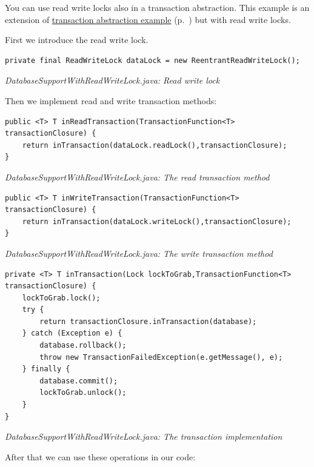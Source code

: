 You can use read write locks also in a transaction abstraction. This example is an extension of \hyperref[ref:advanced-topics-concurrency-share-object-container-threads]{transaction abstraction example} (p.~\pageref{ref:advanced-topics-concurrency-share-object-container-threads}) but with read write locks.

First we introduce the read write lock.

\begin{lstlisting}
private final ReadWriteLock dataLock = new ReentrantReadWriteLock();
\end{lstlisting}

{\small\itshape DatabaseSupportWithReadWriteLock.java: Read write lock\par}
\medskip

Then we implement read and write transaction methods:

\begin{lstlisting}
public <T> T inReadTransaction(TransactionFunction<T> transactionClosure) {
    return inTransaction(dataLock.readLock(),transactionClosure);
}
\end{lstlisting}

{\small\itshape DatabaseSupportWithReadWriteLock.java: The read transaction method\par}
\medskip

\begin{lstlisting}
public <T> T inWriteTransaction(TransactionFunction<T> transactionClosure) {
    return inTransaction(dataLock.writeLock(),transactionClosure);
}
\end{lstlisting}

{\small\itshape DatabaseSupportWithReadWriteLock.java: The write transaction method\par}
\medskip

\begin{lstlisting}
private <T> T inTransaction(Lock lockToGrab,TransactionFunction<T> transactionClosure) {
    lockToGrab.lock();
    try {
        return transactionClosure.inTransaction(database);
    } catch (Exception e) {
        database.rollback();
        throw new TransactionFailedException(e.getMessage(), e);
    } finally {
        database.commit();
        lockToGrab.unlock();
    }
}
\end{lstlisting}

{\small\itshape DatabaseSupportWithReadWriteLock.java: The transaction implementation\par}
\medskip

After that we can use these operations in our code:

